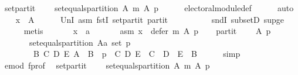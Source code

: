 \begin{isabellebody}
\ set{\isacharunderscore}{\kern0pt}partit{\isacharcolon}{\kern0pt}\isanewline
\ \ \ \ {\isachardoublequoteopen}set{\isacharunderscore}{\kern0pt}equals{\isacharunderscore}{\kern0pt}partition\ A\ {\isacharparenleft}{\kern0pt}m\ A\ p{\isacharparenright}{\kern0pt}{\isachardoublequoteclose}\isanewline
\ \ \ \ \isamarkupfalse%
\ electoral{\isacharunderscore}{\kern0pt}module{\isacharunderscore}{\kern0pt}def\isanewline
\ \ \ \ \isamarkupfalse%
\ auto\isanewline
\ \ \isamarkupfalse%
\ {\isachardoublequoteopen}x\ {\isasymin}\ A{\isachardoublequoteclose}\isanewline
\ \ \ \ \isamarkupfalse%
\ UnI{}\ asm\ fstI\ set{\isacharunderscore}{\kern0pt}partit\ partit\isanewline
\ \ \ \ \ \ \ \ \ \ sndI\ subsetD\ sup{\isacharunderscore}{\kern0pt}ge{}\isanewline
\ \ \ \ \isamarkupfalse%
\ metis\isanewline
{}\isamarkupfalse%
\isanewline
\ \ \isamarkupfalse%
\isanewline
\ \ \ \ x\ {\isacharcolon}{\kern0pt}{\isacharcolon}{\kern0pt}\ {\isachardoublequoteopen}{\isacharprime}{\kern0pt}a{\isachardoublequoteclose}\isanewline
\ \ \isamarkupfalse%
\isanewline
\ \ \ \ asm{\isacharcolon}{\kern0pt}\ {\isachardoublequoteopen}x\ {\isasymin}\ defer\ m\ A\ p{\isachardoublequoteclose}\isanewline
\ \ \isamarkupfalse%
\ partit{\isacharcolon}{\kern0pt}\isanewline
\ \ \ \ {\isachardoublequoteopen}{\isasymforall}A\ p{\isachardot}{\kern0pt}\isanewline
\ \ \ \ \ \ {\isasymnot}\ set{\isacharunderscore}{\kern0pt}equals{\isacharunderscore}{\kern0pt}partition\ {\isacharparenleft}{\kern0pt}A{\isacharcolon}{\kern0pt}{\isacharcolon}{\kern0pt}{\isacharprime}{\kern0pt}a\ set{\isacharparenright}{\kern0pt}\ p\ {\isasymor}\isanewline
\ \ \ \ \ \ \ \ {\isacharparenleft}{\kern0pt}{\isasymexists}B\ C\ D\ E{\isachardot}{\kern0pt}\ A\ {\isacharequal}{\kern0pt}\ B\ {\isasymand}\ p\ {\isacharequal}{\kern0pt}\ {\isacharparenleft}{\kern0pt}C{\isacharcomma}{\kern0pt}\ D{\isacharcomma}{\kern0pt}\ E{\isacharparenright}{\kern0pt}\ {\isasymand}\ C\ {\isasymunion}\ D\ {\isasymunion}\ E\ {\isacharequal}{\kern0pt}\ B{\isacharparenright}{\kern0pt}{\isachardoublequoteclose}\isanewline
\ \ \ \ \isamarkupfalse%
\ simp\isanewline
\ \ \isamarkupfalse%
\ e{\isacharunderscore}{\kern0pt}mod\ f{\isacharunderscore}{\kern0pt}prof\ \isamarkupfalse%
\ set{\isacharunderscore}{\kern0pt}partit{\isacharcolon}{\kern0pt}\isanewline
\ \ \ \ {\isachardoublequoteopen}set{\isacharunderscore}{\kern0pt}equals{\isacharunderscore}{\kern0pt}partition\ A\ {\isacharparenleft}{\kern0pt}m\ A\ p{\isacharparenright}{\kern0pt}{\isachardoublequoteclose}\isanewline

\end{isabellebody}
